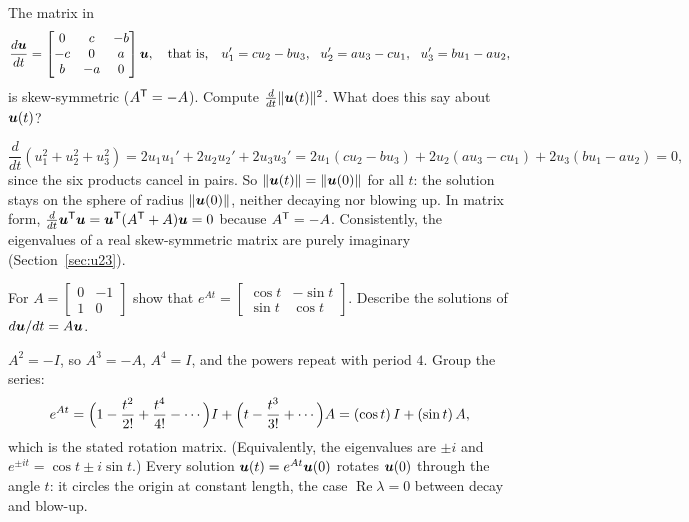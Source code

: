 \begin{exercise}\label{exr:u25-skew}
The matrix in
\[
  \frac{d\vb{u}}{dt}=\begin{bmatrix} 0&c&-b\\ -c&0&a\\ b&-a&0\end{bmatrix}\vb{u},
  \quad\text{that is,}\quad u_1'=cu_2-bu_3,\ \ u_2'=au_3-cu_1,\ \ u_3'=bu_1-au_2,
\]
is skew-symmetric ($A^{\mathsf{T}}=-A$). Compute
$\frac{d}{dt}\|\boldsymbol{u}(t)\|^{2}$. What does this say about $\boldsymbol{u}(t)$?
\end{exercise}
\begin{solution}
\[
  \frac{d}{dt}(u_1^{2}+u_2^{2}+u_3^{2})=2u_1u_1'+2u_2u_2'+2u_3u_3'
  =2u_1(cu_2-bu_3)+2u_2(au_3-cu_1)+2u_3(bu_1-au_2)=0,
\]
since the six products cancel in pairs. So $\|\boldsymbol{u}(t)\|=\|\boldsymbol{u}(0)\|$ for all $t$: the
solution stays on the sphere of radius $\|\boldsymbol{u}(0)\|$, neither decaying nor blowing up. In
matrix form, $\frac{d}{dt}\boldsymbol{u}^{\mathsf{T}}\boldsymbol{u}=\boldsymbol{u}^{\mathsf{T}}(A^{\mathsf{T}}+A)\boldsymbol{u}=0$ because $A^{\mathsf{T}}=-A$.
Consistently, the eigenvalues of a real skew-symmetric matrix are purely imaginary
(Section~\ref{sec:u23}).
\end{solution}

\begin{exercise}\label{exr:u25-rotation}
For $A=\left[\begin{smallmatrix} 0&-1\\ 1&0\end{smallmatrix}\right]$ show that
$e^{At}=\left[\begin{smallmatrix} \cos t & -\sin t\\ \sin t & \cos t\end{smallmatrix}\right]$.
Describe the solutions of $d\boldsymbol{u}/dt=A\boldsymbol{u}$.
\end{exercise}
\begin{solution}
$A^{2}=-I$, so $A^{3}=-A$, $A^{4}=I$, and the powers repeat with period $4$. Group the series:
\[
  e^{At}=\Bigl(1-\frac{t^{2}}{2!}+\frac{t^{4}}{4!}-\cdots\Bigr)I+\Bigl(t-\frac{t^{3}}{3!}+\cdots\Bigr)A
  =(\cos t)\,I+(\sin t)\,A,
\]
which is the stated rotation matrix. (Equivalently, the eigenvalues are $\pm i$ and
$e^{\pm it}=\cos t\pm i\sin t$.) Every solution $\boldsymbol{u}(t)=e^{At}\boldsymbol{u}(0)$ rotates
$\boldsymbol{u}(0)$ through the angle $t$: it circles the origin at constant length, the case
$\operatorname{Re}\lambda=0$ between decay and blow-up.
\end{solution}

